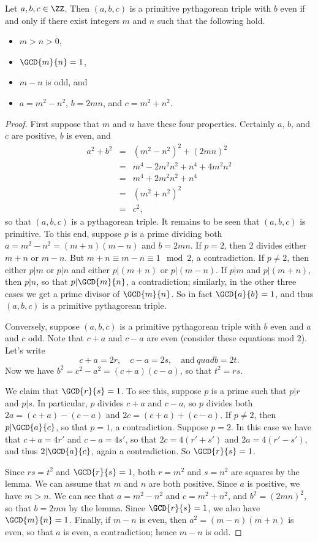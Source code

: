 \documentclass{article}
\begin{document}
\begin{thm}
Let $a,b,c \in \ZZ$. Then $(a,b,c)$ is a primitive pythagorean triple with $b$ even if and only if there exist integers $m$ and $n$ such that the following hold.
\begin{itemize}
\item $m > n > 0$,
\item $\GCD{m}{n} = 1$,
\item $m-n$ is odd, and
\item $a = m^2 - n^2$, $b = 2mn$, and $c = m^2 + n^2$.
\end{itemize}
\end{thm}

\begin{proof}
First suppose that $m$ and $n$ have these four properties. Certainly $a$, $b$, and $c$ are positive, $b$ is even, and
\begin{eqnarray*}
a^2 + b^2 & = & (m^2 - n^2)^2 + (2mn)^2 \\
 & = & m^4 - 2m^2n^2 + n^4 + 4m^2n^2 \\
 & = & m^4 + 2m^2n^2 + n^4 \\
 & = & (m^2 + n^2)^2 \\
 & = & c^2,
\end{eqnarray*}
so that $(a,b,c)$ is a pythagorean triple. It remains to be seen that $(a,b,c)$ is primitive. To this end, suppose $p$ is a prime dividing both $a = m^2 - n^2 = (m+n)(m-n)$ and $b = 2mn$. If $p = 2$, then 2 divides either $m+n$ or $m-n$. But $m+n \equiv m-n \equiv 1 \mod 2$, a contradiction. If $p \neq 2$, then either $p|m$ or $p|n$ and either $p|(m+n)$ or $p|(m-n)$. If $p|m$ and $p|(m+n)$, then $p|n$, so that $p|\GCD{m}{n}$, a contradiction; similarly, in the other three cases we get a prime divisor of $\GCD{m}{n}$. So in fact $\GCD{a}{b} = 1$, and thus $(a,b,c)$ is a primitive pythagorean triple.

Conversely, suppose $(a,b,c)$ is a primitive pythagorean triple with $b$ even and $a$ and $c$ odd. Note that $c+a$ and $c-a$ are even (consider these equations mod 2). Let's write \[ c+a = 2r, \quad c-a = 2s, \quad \mathrm{and}\ quad b = 2t. \] Now we have $b^2 = c^2 - a^2 = (c+a)(c-a)$, so that $t^2 = rs$.

We claim that $\GCD{r}{s} = 1$. To see this, suppose $p$ is a prime such that $p|r$ and $p|s$. In particular, $p$ divides $c+a$ and $c-a$, so $p$ divides both $2a =(c+a) - (c-a)$ and $2c = (c+a) + (c-a)$. If $p \neq 2$, then $p|\GCD{a}{c}$, so that $p = 1$, a contradiction. Suppose $p = 2$. In this case we have that $c+a = 4r'$ and $c-a = 4s'$, so that $2c = 4(r'+s')$ and $2a = 4(r'-s')$, and thus $2|\GCD{a}{c}$, again a contradiction. So $\GCD{r}{s} = 1$.

Since $rs = t^2$ and $\GCD{r}{s} = 1$, both $r = m^2$ and $s = n^2$ are squares by the lemma. We can assume that $m$ and $n$ are both positive. Since $a$ is positive, we have $m > n$. We can see that $a = m^2 - n^2$ and $c = m^2 + n^2$, and $b^2 = (2mn)^2$, so that $b = 2mn$ by the lemma. Since $\GCD{r}{s} = 1$, we also have $\GCD{m}{n} = 1$. Finally, if $m-n$ is even, then $a^2 = (m-n)(m+n)$ is even, so that $a$ is even, a contradiction; hence $m-n$ is odd.
\end{proof}
\end{document}

